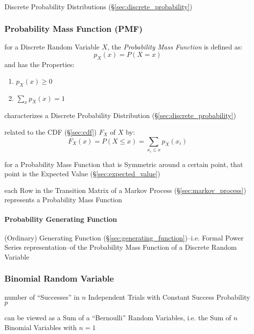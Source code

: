 \fist Discrete Probability Distributions (\S\ref{sec:discrete_probability})



\subsubsection{Probability Mass Function (PMF)}\label{sec:pmf}

for a Discrete Random Variable $X$, the \emph{Probability Mass Function} is
defined as:
\[
  p_X(x) = P(X = x)
\]
and has the Properties:
\begin{enumerate}
  \item $p_X(x) \geq 0$
  \item $\sum_x p_X(x) = 1$
\end{enumerate}

characterizes a Discrete Probability Distribution
(\S\ref{sec:discrete_probability})

related to the CDF (\S\ref{sec:cdf}) $F_X$ of $X$ by:
\[
  F_X(x) = P(X \leq x) = \sum_{x_i \leq x} p_X(x_i)
\]

for a Probability Mass Function that is Symmetric around a certain point, that
point is the Expected Value (\S\ref{sec:expected_value})

\fist each Row in the Transition Matrix of a Markov Process
(\S\ref{sec:markov_process}) represents a Probability Mass Function



\paragraph{Probability Generating Function}
\label{sec:probability_generating_function}\hfill

(Ordinary) Generating Function (\S\ref{sec:generating_function})--i.e. Formal
Power Series representation--of the Probability Mass Function of a Discrete
Random Variable



\subsubsection{Binomial Random Variable}\label{sec:binomial_variable}

number of ``Successes'' in $n$ Independent Trials with Constant Success
Probability $p$

can be viewed as a Sum of a ``Bernoulli'' Random Variables, i.e. the Sum of $n$
Binomial Variables with $n = 1$

